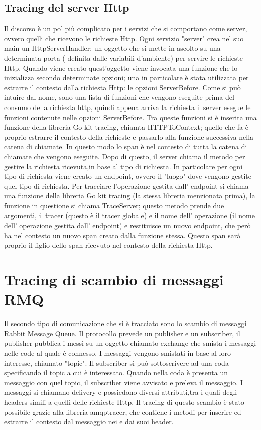 \documentclass[a4paper,12pt,titlepage,italian,openany]{report}
\begin{document}
\subsection{Tracing del server Http}
Il discorso è un po' più complicato per i servizi che si comportano come server, ovvero quelli che ricevono le richieste Http. 
Ogni servizio "server" crea nel suo main un HttpServerHandler: un oggetto che si mette in ascolto su una determinata porta 
( definita dalle variabili d'ambiente) per servire le richieste Http. Quando viene creato quest'oggetto viene invocata una 
funzione che lo inizializza secondo determinate opzioni; una in particolare è stata utilizzata per estrarre il contesto dalla richiesta Http: le opzioni ServerBefore.
 Come si può intuire dal nome, sono una lista di funzioni che vengono eseguite prima del consumo della richiesta http, quindi appena
  arriva la richiesta il server esegue le funzioni contenute nelle opzioni ServerBefore. Tra queste funzioni
   si è inserita una funzione della libreria Go kit tracing, chiamta HTTPToContext; quello che fa è proprio estrarre il contesto
    della richieste e passarlo alla funzione successiva nella catena di chiamate. In questo modo  lo span è nel contesto di tutta
     la catena di chiamate che vengono eseguite.
Dopo di questo, il server chiama il metodo per gestire la richiesta ricevuta,in base al tipo di richiesta. In particolare per ogni tipo di richiesta viene creato un endpoint,
ovvero il "luogo" dove vengono gestite quel tipo di richiesta. Per tracciare l'operazione gestita dall'
endpoint si chiama una funzione della libreria Go kit tracing (la stessa libreria menzionata prima), la funzione in questione si chiama TraceServer; questo metodo prende due argomenti, il tracer (questo è il tracer globale) e il nome dell' operazione (il nome dell' operazione gestita dall' endpoint) e restituisce un nuovo endpoint, che però ha nel contesto un nuovo span creato dalla funzione stessa. Questo span sarà proprio il figlio dello span ricevuto nel contesto della richiesta Http. 

\section{Tracing di scambio di messaggi RMQ}
Il secondo tipo di comunicazione che si è tracciato sono lo scambio di messaggi Rabbit Message Queue. Il protocollo prevede un publisher e un subscriber, il publisher pubblica i messi su un oggetto chiamato exchange che smista i messaggi nelle code al quale è connesso. I messaggi vengono smistati in base al loro interesse, chiamato "topic". Il subscriber si può sottoscrivere ad una coda specificando il topic a cui è interessato. Quando nella coda è presenta un messaggio con quel topic, il subscriber viene avvisato e preleva il messaggio. I messaggi si chiamano delivery e possiedono diversi attributi,tra i quali degli headers simili a quelli delle richieste Http.
Il tracing di questo scambio è stato possibile grazie alla libreria amqptracer, che contiene i metodi per inserire ed estrarre il contesto dal messaggio nei e dai suoi header.
\end{document}

